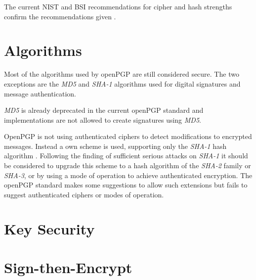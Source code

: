 The current NIST and BSI recommendations for cipher and hash strengths confirm the recommendations given \cite{keylenNIST} \cite{KeylenBSI}. 

\section{Algorithms}




Most of the algorithms used by openPGP are still considered secure. 
The two exceptions are the \textit{MD5} and \textit{SHA-1} algorithms used for digital signatures and message authentication. 

\textit{MD5} is already deprecated in the current openPGP standard \citep[section 14]{RFC4880} and implementations are not allowed to create signatures using \textit{MD5}. 

OpenPGP is not using authenticated ciphers to detect modifications to encrypted messages.
Instead a own scheme is used, supporting only the \textit{SHA-1} hash algorithm \citep[section 5.13]{RFC4880}. 
Following the finding of sufficient serious attacks on \textit{SHA-1} \cite{SHA1attack} it should be considered to upgrade this scheme to a hash algorithm of the \textit{SHA-2} family or \textit{SHA-3}, or by using a mode of operation to achieve authenticated encryption. The openPGP standard makes some suggestions to allow such extensions \citep[section 13.11]{RFC4880} but fails to suggest authenticated ciphers or modes of operation.


\section{Key Security}


\section{Sign-then-Encrypt}

